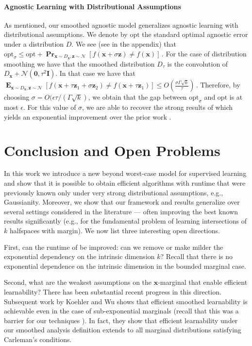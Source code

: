 \documentclass[10pt,a4paper]{article}
\renewcommand\vec[1]{\mathbf{#1}}
\DeclareMathOperator*{\pr}{\mathbf{Pr}}
\DeclareMathOperator*{\E}{\mathbf{E}}
\newcommand{\normal}{\mathcal{N}}
\newcommand{\eps}{\epsilon}
\newcommand{\opt}{\mathrm{opt}}
\newcommand{\1}{\Ind}
\newcommand{\x}{\vec x}
\begin{document}
\paragraph{Agnostic Learning with Distributional Assumptions}
As mentioned, our smoothed agnostic model generalizes agnostic learning with distributional assumptions.
We denote by $\opt$ the standard optimal agnostic error under a distribution $D$.  
We see (see  in the appendix) that 
\(
\opt_\sigma \leq \opt + \pr_{\x \sim D_\x, \vec z \sim \normal}[f(\x + \sigma \vec z) \neq f(\x)]\,.
\)
For the case of distribution smoothing we have that the smoothed distribution $D_\tau$  is the convolution of  $D_\x + \normal(\vec 0, \tau^2 \vec I)$.  In that case we have that 
$
\E_{\x \sim D_\x, \vec z \sim \normal }[f(\x + \tau \vec z_1 + \sigma \vec z_2) \neq f(\x+ \tau \vec z_1)] \leq 
O(\frac{\sigma \Gamma \sqrt{k}}{\tau}) \,.
$
Therefore, by choosing $\sigma = O(\eps \tau/(\Gamma \sqrt{k})$, we obtain that the gap between $\opt_{\sigma}$ and $\opt$
is at most $\eps$. For this value of $\sigma$, we are able to recover the strong results of  which yields an exponential improvement over the prior work \cite{Kane2013LearningHalfspacesLogConcave}.

\section{Conclusion and Open Problems}
In this work we introduce a new beyond worst-case model for supervised learning and show that it is possible
to obtain efficient algorithms with runtime that were previously known only under very strong distributional assumptions, e.g., Gaussianity.  Moreover, we show that our framework and results generalize over several
settings considered in the literature --- often improving the best known results significantly (e.g., 
for the fundamental problem of learning intersections of $k$ halfspaces with margin). We now list three interesting open directions. 

First, can the runtime 
of  be improved: can we remove or make milder the exponential dependency on the intrinsic dimension $k$? Recall that there is no exponential dependence on the intrinsic dimension in the bounded marginal case. 

Second, what are the weakest assumptions on the $\x$-marginal that enable efficient learnability? There has been substantial recent progress in this direction. Subsequent work by Koehler and Wu \cite{koehler2025constructive} shows that efficient smoothed learnability is achievable even in the case of sub-exponential marginals (recall that this was a barrier for our techniques ). In fact, they show that efficient learnability under our smoothed analysis definition extends to all marginal distributions satisfying Carleman's conditions.
\end{document}
